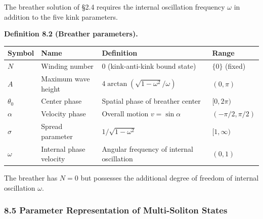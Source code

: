 \documentclass[a4paper,11pt]{article}
\newcounter{none}
\begin{document}
The breather solution of §2.4 requires the internal oscillation
frequency \(\omega\) in addition to the five kink parameters.

\textbf{Definition 8.2 (Breather parameters).}

{\def\LTcaptype{none} %
\begin{longtable}[]{@{}
  >{\centering\arraybackslash}p{}
  >{\centering\arraybackslash}p{}
  >{\centering\arraybackslash}p{}
  >{\centering\arraybackslash}p{}@{}}
\toprule\noalign{}
\begin{minipage}[b]{\linewidth}\centering
Symbol
\end{minipage} & \begin{minipage}[b]{\linewidth}\centering
Name
\end{minipage} & \begin{minipage}[b]{\linewidth}\centering
Definition
\end{minipage} & \begin{minipage}[b]{\linewidth}\centering
Range
\end{minipage} \\
\midrule\noalign{}
\endhead
\bottomrule\noalign{}
\endlastfoot
\(N\) & Winding number & \(0\) (kink-anti-kink bound state) & \(\{0\}\)
(fixed) \\
\(A\) & Maximum wave height & \(4\arctan(\sqrt{1-\omega^2}/\omega)\) &
\((0, \pi)\) \\
\(\theta_0\) & Center phase & Spatial phase of breather center &
\([0, 2\pi)\) \\
\(\alpha\) & Velocity phase & Overall motion \(v = \sin\alpha\) &
\((-\pi/2, \pi/2)\) \\
\(\sigma\) & Spread parameter & \(1/\sqrt{1-\omega^2}\) &
\([1, \infty)\) \\
\(\omega\) & Internal phase velocity & Angular frequency of internal
oscillation & \((0, 1)\) \\
\end{longtable}
}

The breather has \(N = 0\) but possesses the additional degree of
freedom of internal oscillation \(\omega\).

\subsubsection{8.5 Parameter Representation of Multi-Soliton
States}\label{parameter-representation-of-multi-soliton-states}
\end{document}
